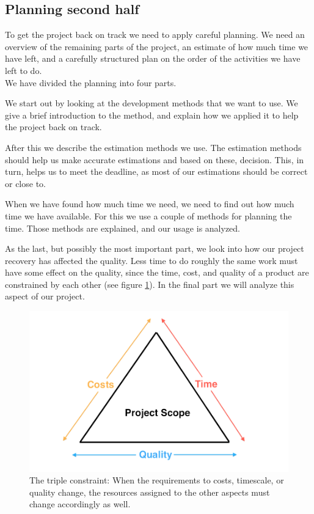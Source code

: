 \subsection{Planning second half}
To get the project back on track we need to apply careful planning. We need an overview of the remaining parts of the project, an estimate of how much time we have left, and a carefully structured plan on the order of the activities we have left to do.\\
We have divided the planning into four parts.

We start out by looking at the development methods that we want to use. We give a brief introduction to the method, and explain how we applied it to help the project back on track.

After this we describe the estimation methods we use. The estimation methods should help us make accurate estimations and based on these, decision. This, in turn, helps us to meet the deadline, as most of our estimations should be correct or close to.

When we have found how much time we need, we need to find out how much time we have available. For this we use a couple of methods for planning the time. Those methods are explained, and our usage is analyzed.

As the last, but possibly the most important part, we look into how our project recovery has affected the quality. Less time to do roughly the same work must have some effect on the quality, since the time, cost, and quality of a product are constrained by each other (see figure \ref{fig:timeCostsQuality})\cite[p. 191]{PM}. In the final part we will analyze this aspect of our project.

\begin{figure}[t]
  \includegraphics[width=\textwidth]{illustrations/timeCostsQuality}
  \caption{The triple constraint: When the requirements to costs, timescale, or quality change, the resources assigned to the other aspects must change accordingly as well.}
  \label{fig:timeCostsQuality}
\end{figure}